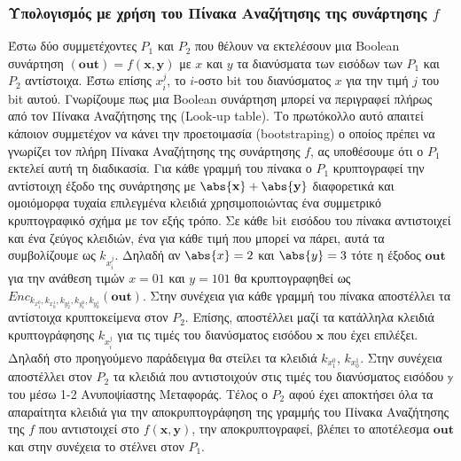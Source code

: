 \subsubsection{Υπολογισμός με χρήση του Πίνακα Αναζήτησης της συνάρτησης $f$}

Έστω δύο συμμετέχοντες $P_1$ και $P_2$ που θέλουν να εκτελέσουν μια Boolean συνάρτηση $(\mathbf{out}) = f(\mathbf{x}, \mathbf{y})$ με $x$ και $y$ τα διανύσματα των εισόδων των $P_1$ και $P_2$ αντίστοιχα. Έστω επίσης $x_i^j$, το $i$-οστο bit του διανύσματος $x$ για την τιμή $j$ του bit αυτού.  Γνωρίζουμε πως μια Boolean συνάρτηση μπορεί να περιγραφεί πλήρως από τον Πίνακα Αναζήτησης της (Look-up table). Το πρωτόκολλο αυτό απαιτεί κάποιον συμμετέχον να κάνει την προετοιμασία (bootstraping) ο οποίος πρέπει να γνωρίζει τον πλήρη Πίνακα Αναζήτησης της συνάρτησης $f$, ας υποθέσουμε ότι ο $P_1$ εκτελεί αυτή τη διαδικασία. Για κάθε γραμμή του πίνακα ο $P_1$ κρυπτογραφεί την αντίστοιχη έξοδο της συνάρτησης με $\abs{\mathbf{x}} + \abs{\mathbf{y}}$ διαφορετικά και ομοιόμορφα τυχαία επιλεγμένα κλειδιά χρησιμοποιώντας ένα συμμετρικό κρυπτογραφικό σχήμα με τον εξής τρόπο. Σε κάθε bit εισόδου του πίνακα αντιστοιχεί και ένα ζεύγος κλειδιών, ένα για κάθε τιμή που μπορεί να πάρει, αυτά τα συμβολίζουμε ως $k_{x_i^j}$. Δηλαδή αν $\abs{x}=2$ και $\abs{y}=3$ τότε η έξοδος $\mathbf{out}$ για την ανάθεση τιμών $x=01$ και $y=101$ θα κρυπτογραφηθεί ως $Enc_{k_{x_1^0}, k_{x_0^1}, k_{y_2^1}, k_{y_1^0}, k_{y_0^1}}(\mathbf{out})$. Στην συνέχεια για κάθε γραμμή του πίνακα αποστέλλει τα αντίστοιχα κρυπτοκείμενα στον $P_2$. Επίσης, αποστέλλει μαζί τα κατάλληλα κλειδιά κρυπτογράφησης $k_{x_i^j}$ για τις τιμές του διανύσματος εισόδου $\mathbf{x}$ που έχει επιλέξει. Δηλαδή στο προηγούμενο παράδειγμα θα στείλει τα κλειδιά $k_{x_1^0}$, $k_{x_0^1}$. Στην συνέχεια αποστέλλει στον $P_2$ τα κλειδιά που αντιστοιχούν στις τιμές του διανύσματος εισόδου $\mathbb{y}$ του μέσω 1-2 Ανυποψίαστης Μεταφοράς. Τέλος ο $P_2$ αφού έχει αποκτήσει όλα τα απαραίτητα κλειδιά για την αποκρυπτογράφηση της γραμμής του Πίνακα Αναζήτησης της $f$ που αντιστοιχεί στο $f(\mathbf{x}, \mathbf{y})$, την αποκρυπτογραφεί, βλέπει το αποτέλεσμα $\mathbf{out}$ και στην συνέχεια το στέλνει στον $P_1$.

